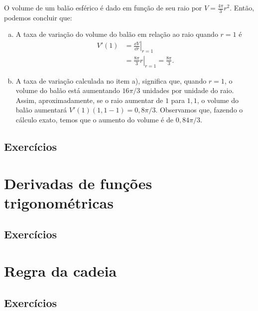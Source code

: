 \begin{ex}
  O volume de um balão esférico é dado em função de seu raio por $\displaystyle V = \frac{4\pi}{3}r^2$. Então, podemos concluir que:
  \begin{enumerate}[a)]
  \item A taxa de variação do volume do balão em relação ao raio quando $r=1$ é
    \begin{align}
      V'(1) &= \left.\frac{\dd V}{\dd r}\right|_{r=1}\\
            &= \left.\frac{8\pi}{3}r\right|_{r=1} = \frac{8\pi}{3}.
    \end{align}
  \item A taxa de variação calculada no item a), significa que, quando $r=1$, o volume do balão está aumentando $16\pi/3$ unidades por unidade do raio. Assim, aproximadamente, se o raio aumentar de $1$ para $1,1$, o volume do balão aumentará $V'(1)(1,1-1) = 0,8\pi/3$. Observamos que, fazendo o cálculo exato, temos que o aumento do volume é de $0,84\pi/3$. 
  \end{enumerate}
\end{ex}

\subsection*{Exercícios}

\emconstrucao

\section{Derivadas de funções trigonométricas}\label{cap_deriv_sec_trigo}

\emconstrucao

\subsection*{Exercícios}

\emconstrucao

\section{Regra da cadeia}\label{cap_deriv_sec_cadeia}

\emconstrucao

\subsection*{Exercícios}

